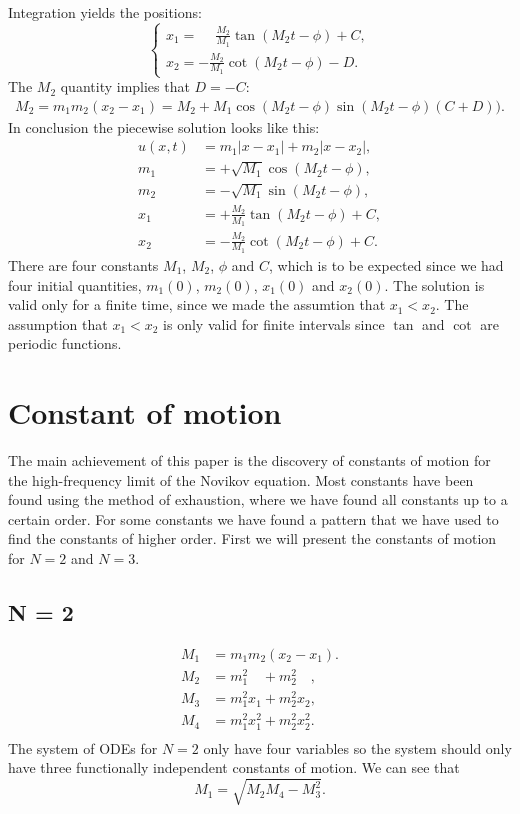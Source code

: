 \documentclass[english,master]{liumaiex}
\theoremstyle{plain}
\theoremstyle{definition}
\begin{document}
%
Integration yields the positions:
\begin{equation}
\left\{ \begin{aligned}
	x_1 = \phantom{-}\frac{M_2}{M_1}\tan(M_2t - \phi) + C,\\
	x_2 = -\frac{M_2}{M_1}\cot(M_2t - \phi) - D.
\end{aligned} \right.
\end{equation}
%
The $M_2$ quantity implies that $D = -C$:
\begin{align}
	M_2 = m_1m_2(x_2 - x_1) = M_2 + M_1\cos(M_2t-\phi)\sin(M_2t-\phi)(C + D)).
\end{align}
%
In conclusion the piecewise solution looks like this:
\begin{align}
	u(x, t) &= m_1|x - x_1| + m_2|x - x_2|, \\
	m_1 &= +\sqrt{M_1} \cos(M_2t - \phi), \\
	m_2 &= -\sqrt{M_1} \sin(M_2t - \phi), \\
	x_1 &= +\frac{M_2}{M_1}\tan(M_2t - \phi) + C, \\
	x_2 &= -\frac{M_2}{M_1}\cot(M_2t - \phi) + C.
\end{align}
%
There are four constants $M_1$, $M_2$, $\phi$ and $C$, which is to be expected since we had four initial quantities, $m_1(0)$, $m_2(0)$, $x_1(0)$ and $x_2(0)$. The solution is valid only for a finite time, since we made the assumtion that $x_1 < x_2$. The assumption that $x_1 < x_2$ is only valid for finite intervals since $\tan$ and $\cot$ are periodic functions.

\chapter{Constant of motion}

The main achievement of this paper is the discovery of constants of motion for the high-frequency limit of the Novikov equation. Most constants have been found using the method of exhaustion, where we have found all constants up to a certain order. For some constants we have found a pattern that we have used to find the constants of higher order. First we will present the constants of motion for $N = 2$ and $N = 3$.

\section{N = 2}

\begin{align}
	M_1 &= m_1 m_2 (x_2 - x_1). \\
	M_2 &= m_1^2\phantom{x_1} + m_2^2\phantom{x_2}, \\
	M_3 &= m_1^2 x_1 + m_2^2 x_2, \\
	M_4 &= m_1^2 x_1^2 + m_2^2 x_2^2. \\
\end{align}
%
The system of ODEs for $N = 2$ only have four variables so the system should only have three functionally independent constants of motion. We can see that
\begin{equation}
	M_1 = \sqrt{M_2M_4 - M_3^2}.	
\end{equation}
\end{document}

